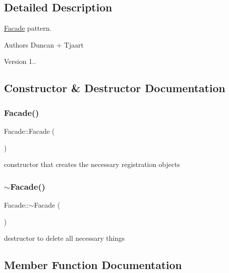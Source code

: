 \subsection{Detailed Description}
\mbox{\hyperlink{class_facade}{Facade}} pattern. 

\begin{DoxyAuthor}{Authors}
Duncan + Tjaart 
\end{DoxyAuthor}
\begin{DoxyVersion}{Version}
1.. 
\end{DoxyVersion}


\subsection{Constructor \& Destructor Documentation}
\mbox{\label{class_facade_a8e0f43c604499d9d603236929b3ac488}} 
\subsubsection{\texorpdfstring{Facade()}{Facade()}}
{\footnotesize\ttfamily Facade\+::\+Facade (\begin{DoxyParamCaption}{ }\end{DoxyParamCaption})}

constructor that creates the necessary registration objects \mbox{\label{class_facade_a169c5f53bfcb40710dc621f464237c62}} 
\subsubsection{\texorpdfstring{$\sim$\+Facade()}{~Facade()}}
{\footnotesize\ttfamily Facade\+::$\sim$\+Facade (\begin{DoxyParamCaption}{ }\end{DoxyParamCaption})}

destructor to delete all necessary things 

\subsection{Member Function Documentation}
\mbox{\label{class_facade_acb151bb025ef7238bc92fe7b474293e3}} 
